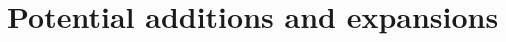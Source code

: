 	\section{Potential additions and expansions}
	\label{sec:end-further}
		\begin{comment}
		Potential additions are to target the software frontend application. The developed Android application is a (domain specific) general purpose monitoring frontend that should provide a solid framework for further developments.\\

		Professional multipatient monitoring could come in two flavours:\\

		Visual-less multipatient monitoring in which a computer receives data from a variable number of wireless delineation nodes, e.g. employing the 802.15.4 receiver, storing it and acting as a server, or directly sending the log files to the actual server. The Android device would then download the log from the server and the own frontend application developed in the scope of this project could be used as the visualization device.\\

		The other option is simultaneous multipatient monitorization in an Android device. The monitorization application on the device would allow switching between patient ECG wave visualization while logging all received data, which could then be uploaded to a server.\\

		(Both of these expansions could find an employment in acutal medical environment.)


		More improvements can include the implementation of more detailed log navigation functionality, including information about the actual recording time and searching of specific time moments.
		Inclusion of event data into the log (like body weakness sensation or feeling of dizziness) could also be useful.
		(This two are for personal monitorization and inhome healthcare)\\

		Message sending when certain events occur (low or high hbr or arrythmia detection), text message, email, even a phone call could help constant monitorization requiring people. GPS information could be included in the message for quick localization of the affected person by the healthcare personal.

		\end{comment}

